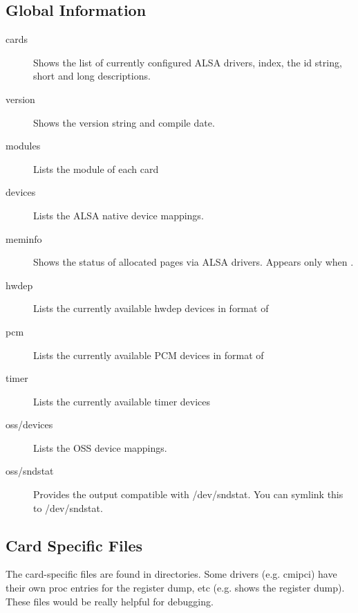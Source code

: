 \documentclass[a4paper,8pt,english]{sphinxmanual}
\begin{document}
\subsection{Global Information}
\label{sound/designs/procfile:global-information}\begin{description}
\item[{cards}] \leavevmode
Shows the list of currently configured ALSA drivers,
index, the id string, short and long descriptions.

\item[{version}] \leavevmode
Shows the version string and compile date.

\item[{modules}] \leavevmode
Lists the module of each card

\item[{devices}] \leavevmode
Lists the ALSA native device mappings.

\item[{meminfo}] \leavevmode
Shows the status of allocated pages via ALSA drivers.
Appears only when .

\item[{hwdep}] \leavevmode
Lists the currently available hwdep devices in format of

\item[{pcm}] \leavevmode
Lists the currently available PCM devices in format of

\item[{timer}] \leavevmode
Lists the currently available timer devices

\item[{oss/devices}] \leavevmode
Lists the OSS device mappings.

\item[{oss/sndstat}] \leavevmode
Provides the output compatible with /dev/sndstat.
You can symlink this to /dev/sndstat.

\end{description}


\subsection{Card Specific Files}
\label{sound/designs/procfile:card-specific-files}
The card-specific files are found in  directories.
Some drivers (e.g. cmipci) have their own proc entries for the
register dump, etc (e.g.  shows the register
dump).  These files would be really helpful for debugging.
\end{document}
